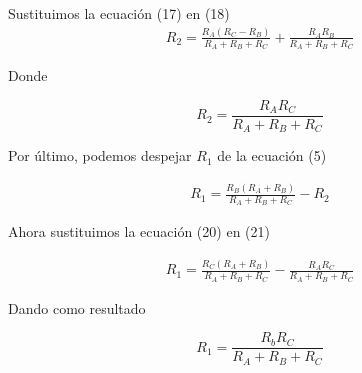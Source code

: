 \documentclass{article}
\begin{document}
Sustituimos la ecuación (17) en (18)
\begin{align}
	R_2 = \frac{R_A(R_C - R_B)}{R_A + R_B + R_C} + \frac{R_AR_B}{R_A + R_B + R_C}
\end{align}

Donde
\begin{tcolorbox}[colback=red!5!white,colframe=red!75!black,arc=0mm,boxrule=0mm,width=(\linewidth+0.5cm)]
	\begin{equation}
		R_2 = \frac{R_AR_C}{R_A + R_B + R_C}
	\end{equation}
\end{tcolorbox}

Por último, podemos despejar $R_1$ de la ecuación (5)

\begin{align}
	R_1 = \frac{R_B(R_A + R_B)}{R_A + R_B + R_C} - R_2
\end{align}

Ahora sustituimos la ecuación (20) en (21)

\begin{align}
R_1 = \frac{R_C(R_A + R_B)}{R_A + R_B + R_C} - \frac{R_AR_C}{R_A + R_B + R_C}
\end{align}

Dando como resultado
\begin{tcolorbox}[colback=red!5!white,colframe=red!75!black,arc=0mm,boxrule=0mm,width=(\linewidth+0.5cm)]
	\begin{equation}
		R_1 = \frac{R_bR_C}{R_A + R_B + R_C}
	\end{equation}
\end{tcolorbox}
\end{document}
